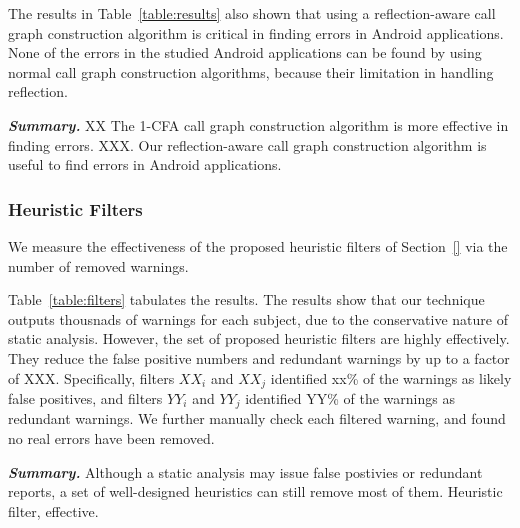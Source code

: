 The results in Table~\ref{table:results} also shown that using a reflection-aware
call graph construction algorithm is critical in finding errors in Android
applications. None of the errors in the studied Android applications
can be found by using normal call graph construction algorithms, because their 
limitation in handling reflection.

\vspace{1mm}

\noindent \textbf{\textit{Summary.}} XX The 1-CFA call graph construction
algorithm is more effective in finding errors. XXX. Our reflection-aware call
graph construction algorithm is useful to find errors in
Android applications.

\subsubsection{Heuristic Filters}
\label{sec:filters}

We measure the effectiveness of the proposed heuristic filters of
Section~\ref{} via the number of removed warnings.

Table~\ref{table:filters} tabulates the results. The results show that
our technique outputs thousnads of warnings for each subject, due to
the conservative nature of static analysis.  However, the
set of proposed heuristic filters are highly effectively. They
 reduce the false positive numbers and redundant warnings by up to a factor of
XXX. Specifically, filters $XX_i$ and $XX_j$  identified xx\% of
the warnings as likely false positives, and filters $YY_i$
and $YY_j$ identified YY\% of the warnings as redundant warnings.
We further manually check each filtered warning, and found no
real errors have been removed.

\vspace{1mm}

\noindent \textbf{\textit{Summary.}} Although a static analysis may
issue false postivies or redundant reports, a set of well-designed
heuristics can still remove most of them.
Heuristic filter, effective.

